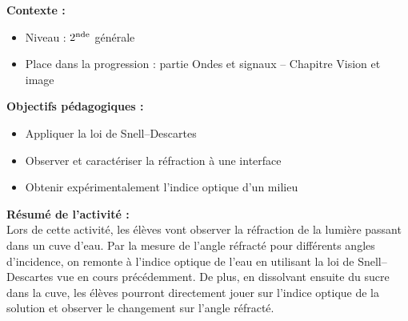 \documentclass[a4paper,11pt]{article} %
\newenvironment{encart}[1]{%
	\begin{tcolorbox}
		[
		breakable, enhanced jigsaw, %
		arc = 1mm, %
		title = \textbf{#1}, %
		coltitle = white, %
		colbacktitle = blue, %
		colback = white, %
		colframe = blue %
		]
}{		
	\end{tcolorbox}
	\vspace*{0.35cm}
}
\begin{document}
	
	\begin{encart}{Activité pédagogique 2 : Phénomène de réfraction -- Loi de Snell--Descartes}
		\textbf{Contexte :}
		\begin{itemize}
			\item Niveau : $ 2^\textup{nde} $ générale
			\item Place dans la progression : partie Ondes et signaux -- Chapitre Vision et image
		\end{itemize}
		\vspace{0.5cm}
		
		\textbf{Objectifs pédagogiques :}
		\begin{itemize}
			\item Appliquer la loi de Snell--Descartes
			\item Observer et caractériser la réfraction à une interface
			\item Obtenir expérimentalement l'indice optique d'un milieu
		\end{itemize}
		\vspace{0.5cm}
		
		\textbf{Résumé de l'activité :}\\
		Lors de cette activité, les élèves vont observer la réfraction de la lumière passant dans un cuve d'eau. Par la mesure de l'angle réfracté pour différents angles d'incidence, on remonte à l'indice optique de l'eau en utilisant la loi de Snell--Descartes vue en cours précédemment. De plus, en dissolvant ensuite du sucre dans la cuve, les élèves pourront directement jouer sur l'indice optique de la solution et observer le changement sur l'angle réfracté.\\
		

\end{encart}
\end{document}
